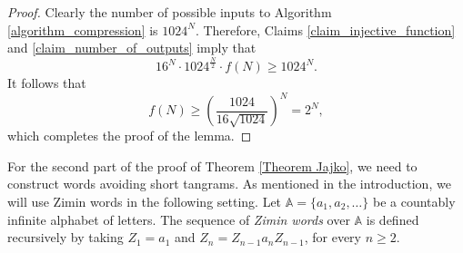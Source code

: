 \documentclass[12pt]{amsart}
\theoremstyle{plain}
\numberwithin{equation}{section}
\begin{document}
\begin{proof}
	Clearly the number of possible inputs to Algorithm \ref{algorithm_compression} is $1024^N$. Therefore, Claims \ref{claim_injective_function} and \ref{claim_number_of_outputs} imply that
	$$
	16^N\cdot1024^{\frac{N}{2}}\cdot f(N) \geqslant 1024^N.
	$$
	It follows that
	$$
	f(N) \geqslant \left( \frac{1024}{16\sqrt{1024}}\right)^N = 2^N,
	$$
	which completes the proof of the lemma.
\end{proof}

For the second part of the proof of Theorem \ref{Theorem Jajko}, we need to construct words avoiding short tangrams. As mentioned in the introduction, we will use Zimin words in the following setting. Let $\mathbb{A}=\{a_1,a_2,\ldots\}$ be a countably infinite alphabet of letters. The sequence of \emph{Zimin words} over $\mathbb{A}$ is defined recursively by taking $Z_1=a_1$ and $Z_{n}=Z_{n-1}a_nZ_{n-1}$, for every $n\geqslant 2$.
\end{document}
